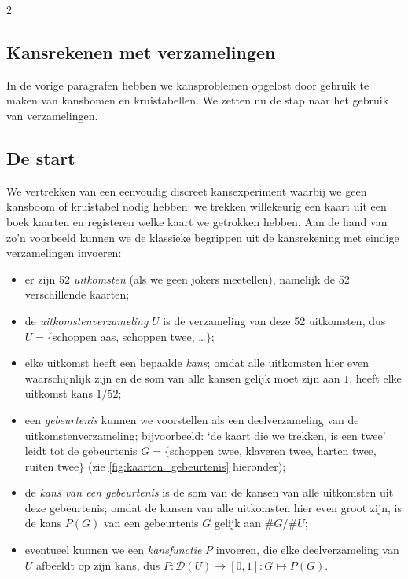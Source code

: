\begin{multicols}{2}
\subsection{Kansrekenen met verzamelingen}
\label{par:verz}
In de vorige paragrafen hebben we kansproblemen opgelost door gebruik te maken van kansbomen en kruistabellen. We zetten nu de stap naar het gebruik van verzamelingen.

\subsection*{De start}

We vertrekken van een eenvoudig discreet kansexperiment waarbij we geen kansboom of kruistabel nodig hebben: we trekken willekeurig een kaart uit een boek kaarten en registeren welke kaart we getrokken hebben. Aan de hand van zo’n voorbeeld kunnen we de klassieke begrippen uit de kansrekening met eindige verzamelingen invoeren:

\begin{itemize}
    \item er zijn 52 \emph{uitkomsten} (als we geen jokers meetellen), namelijk de 52 verschillende kaarten;
    \item de \emph{uitkomstenverzameling} $U$ is de verzameling van deze 52 uitkomsten, dus $U=\{$schoppen aas, schoppen twee, …$\}$;
    \item elke uitkomst heeft een bepaalde \emph{kans}; omdat alle uitkomsten hier even waarschijnlijk zijn en de som van alle kansen gelijk moet zijn aan $1$, heeft elke uitkomst kans $1/52$;
    \item een \emph{gebeurtenis} kunnen we voorstellen als een deelverzameling van de uitkomstenverzameling; bijvoorbeeld: ‘de kaart die we trekken, is een twee’ leidt tot de gebeurtenis $G=\{$schoppen twee, klaveren twee, harten twee, ruiten twee$\}$ (zie \autoref{fig:kaarten_gebeurtenis} hieronder);
    \item de \emph{kans van een gebeurtenis} is de som van de kansen van alle uitkomsten uit deze gebeurtenis; omdat de kansen van alle uitkomsten hier even groot zijn, is de kans $P(G)$ van een gebeurtenis $G$ gelijk aan $\#G/\#U$;
    \item eventueel kunnen we een \emph{kansfunctie} $P$ invoeren, die elke deelverzameling van $U$ afbeeldt op zijn kans, dus $P:\mathcal{D}(U) \rightarrow [0,1]:G \mapsto P(G)$.
\end{itemize}


\end{multicols}
